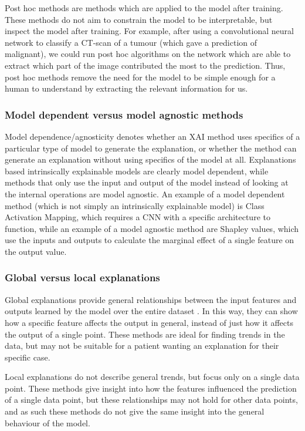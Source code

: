 \documentclass[UKenglish]{uiomasterthesis} %
\theoremstyle{definition}
\begin{document}
Post hoc methods are methods which are applied to the model after training. These methods do not aim to constrain the model to be interpretable, but inspect the model after training. For example, after using a convolutional neural network to classify a CT-scan of a tumour (which gave a prediction of malignant), we could run post hoc algorithms on the network which are able to extract which part of the image contributed the most to the prediction. Thus, post hoc methods remove the need for the model to be simple enough for a human to understand by extracting the relevant information for us.

\subsubsection{Model dependent versus model agnostic methods}

Model dependence/agnosticity denotes whether an XAI method uses specifics of a particular type of model to generate the explanation, or whether the method can generate an explanation without using specifics of the model at all. Explanations based intrinsically explainable models are clearly model dependent, while methods that only use the input and output of the model instead of looking at the internal operations are model agnostic. An example of a model dependent method (which is not simply an intrinsically explainable model) is Class Activation Mapping, which requires a CNN with a specific architecture to function, while an example of a model agnostic method are Shapley values, which use the inputs and outputs to calculate the marginal effect of a single feature on the output value.

\subsubsection{Global versus local explanations}

Global explanations provide general relationships between the input features and outputs learned by the model over the entire dataset \cite{xaioverview}. In this way, they can show how a specific feature affects the output in general, instead of just how it affects the output of a single point. These methods are ideal for finding trends in the data, but may not be suitable for a patient wanting an explanation for their specific case.

Local explanations do not describe general trends, but focus only on a single data point. These methods give insight into how the features influenced the prediction of a single data point, but these relationships may not hold for other data points, and as such these methods do not give the same insight into the general behaviour of the model.
\end{document}

